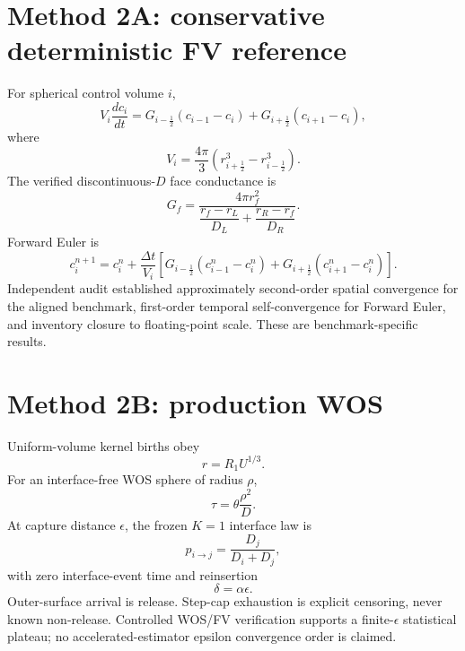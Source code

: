 \documentclass[11pt]{article}
\begin{document}
\section{Method 2A: conservative deterministic FV reference}
For spherical control volume $i$,
\begin{equation}
V_i\frac{dc_i}{dt}
=G_{i-\frac12}(c_{i-1}-c_i)+G_{i+\frac12}(c_{i+1}-c_i),
\end{equation}
where
\begin{equation}
V_i=\frac{4\pi}{3}(r_{i+\frac12}^3-r_{i-\frac12}^3).
\end{equation}
The verified discontinuous-$D$ face conductance is
\begin{equation}
G_f=\frac{4\pi r_f^2}
{\dfrac{r_f-r_L}{D_L}+\dfrac{r_R-r_f}{D_R}}.
\end{equation}
Forward Euler is
\begin{equation}
c_i^{n+1}=c_i^n+\frac{\Delta t}{V_i}
\left[G_{i-\frac12}(c_{i-1}^n-c_i^n)+G_{i+\frac12}(c_{i+1}^n-c_i^n)\right].
\end{equation}
Independent audit established approximately second-order spatial convergence for the aligned benchmark, first-order temporal self-convergence for Forward Euler, and inventory closure to floating-point scale. These are benchmark-specific results.

\section{Method 2B: production WOS}
Uniform-volume kernel births obey
\begin{equation}
r=R_1U^{1/3}.
\end{equation}
For an interface-free WOS sphere of radius $\rho$,
\begin{equation}
\tau=\theta\frac{\rho^2}{D}.
\end{equation}
At capture distance $\epsilon$, the frozen $K=1$ interface law is
\begin{equation}
p_{i\to j}=\frac{D_j}{D_i+D_j},
\end{equation}
with zero interface-event time and reinsertion
\begin{equation}
\delta=\alpha\epsilon.
\end{equation}
Outer-surface arrival is release. Step-cap exhaustion is explicit censoring, never known non-release. Controlled WOS/FV verification supports a finite-$\epsilon$ statistical plateau; no accelerated-estimator epsilon convergence order is claimed.
\end{document}
